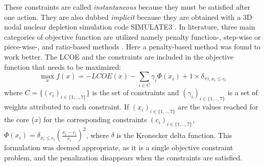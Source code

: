 \documentclass[a4paper]{article}
\begin{document}
 These constraints are called \textit{instantaneous} \cite{liu2021policy} because they must be satisfied after one action. They are also dubbed \textit{implicit} \cite{liu2021policy} because they are obtained with a 3D nodal nuclear depletion simulation code SIMULATE3 \cite{rempe1989simulate}.
In literature,  three main categories of objective function are utilized namely penalty function-, step-wise or piece-wise-, and ratio-based methods \cite{li2022areview}. Here a penalty-based method was found to work better. The LCOE and the constraints are included in the objective function that needs to be maximized:
\begin{equation}
    \max_{x} f(x) = - LCOE (x) - \sum_{i \in C} \gamma_i \Phi(x_i) + 1 \times \delta_{\forall i, x_i \le c_i}
    \label{eq:NucCoreObj}
\end{equation}
where $C = \{ (c_{i})_{i \in \{1,..,7\}} \}$ is the set of constraints and $(\gamma_{i})_{i \in \{1,..,7\}}$ is a set of weights attributed to each constraint. If $ (x_{i})_{i \in \{1,..,7\}}$ are the values reached for the core ($x$) for the corresponding constraints $(c_{i})_{i \in \{1,..,7\}}$, $\Phi(x_i) = \delta_{x_i \le c_i} (\frac{x_i - c_i}{c_i})^2$, where $\delta$ is the Kronecker delta function. This formulation was deemed appropriate, as it is a single objective constraint problem, and the penalization disappears when the constraints are satisfied. 
\end{document}
